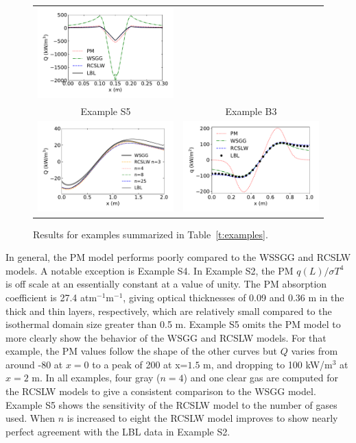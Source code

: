 \documentclass[preprint,12pt, a4paper]{elsarticle}
\begin{document}
\begin{figure}
\begin{center}
\begin{tabular}{c c}
        \includegraphics[width=3 in]{ex_4a.pdf} \\
        Example S5 & Example B3 \\
        \includegraphics[width=3 in]{ex_5b.pdf} &
        \includegraphics[width=3 in]{ex_6.pdf}
    \end{tabular}
    \caption{Results for examples summarized in Table~\ref{t:examples}.}
    \label{f:examples}
    \end{center}
\end{figure}
%
In general, the PM model performs poorly compared to the WSSGG and RCSLW models. A notable exception is Example S4. In Example S2, the PM $q(L)/\sigma T^4$ is off scale at an essentially constant at a value of unity. The PM absorption coefficient is 27.4 atm$^{-1}$m$^{-1}$, giving optical thicknesses of 0.09 and 0.36 m in the thick and thin layers, respectively, which are relatively small compared to the isothermal domain size greater than 0.5 m. Example S5 omits the PM model to more clearly show the behavior of the WSGG and RCSLW models. For that example, the PM values follow the shape of the other curves but $Q$ varies from around -80 at $x=0$ to a peak of 200 at x=$1.5$ m, and dropping to 100 kW/m$^3$ at $x=2$ m. In all examples, four gray ($n=4$) and one clear gas are computed for the RCSLW models to give a consistent comparison to the WSGG model. Example S5 shows the sensitivity of the RCSLW model to the number of gases used. When $n$ is increased to eight the RCSLW model improves to show nearly perfect agreement with the LBL data in Example S2.
\end{document}
